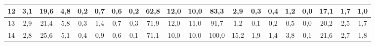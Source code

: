 \begin{sidewaystable}[]
\begin{tabular}{|c|c|c|c|c|c|c|c|c|c|c|c|c|c|c|c|c|c|c|c|}
    12 & 3,1                                              & 19,6                                             & 4,8                                              & 0,2                                              & 0,7                                              & 0,6                                              & 0,2                                              & 62,8                                            & 12,0                                            & 10,0                                            & 83,3                                            & 2,9                                             & 0,3                                             & 0,4                                             & 1,2                                             & 0,0                                             & 17,1                                             & 1,7                                              & 1,0                                              \\ \hline
    13 & 2,9                                              & 21,4                                             & 5,8                                              & 0,3                                              & 1,4                                              & 0,7                                              & 0,3                                              & 71,9                                            & 12,0                                            & 11,0                                            & 91,7                                            & 1,2                                             & 0,1                                             & 0,2                                             & 0,5                                             & 0,0                                             & 20,2                                             & 2,5                                              & 1,7                                              \\ \hline
    14 & 2,8                                              & 25,6                                             & 5,1                                              & 0,4                                              & 0,9                                              & 0,6                                              & 0,1                                              & 71,1                                            & 10,0                                            & 10,0                                            & 100,0                                           & 15,2                                            & 1,9                                             & 1,4                                             & 3,8                                             & 0,1                                             & 21,6                                             & 2,7                                              & 1,8                                              \\ \hline

\end{tabular}
\end{sidewaystable}
